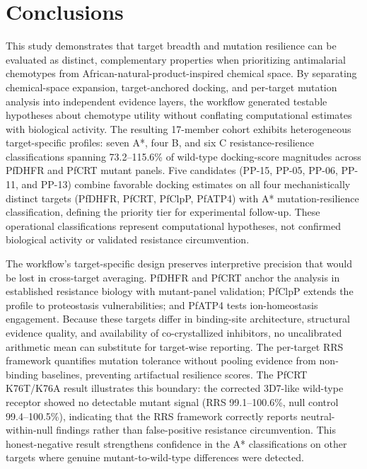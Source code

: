 \documentclass[11pt,a4paper]{article}
\begin{document}
	\section{Conclusions}\label{sec:conclusion}
This study demonstrates that target breadth and mutation resilience can be evaluated as distinct, complementary properties when prioritizing antimalarial chemotypes from African-natural-product-inspired chemical space. By separating chemical-space expansion, target-anchored docking, and per-target mutation analysis into independent evidence layers, the workflow generated testable hypotheses about chemotype utility without conflating computational estimates with biological activity. The resulting 17-member cohort exhibits heterogeneous target-specific profiles: seven A*, four B, and six C resistance-resilience classifications spanning 73.2--115.6\% of wild-type docking-score magnitudes across PfDHFR and PfCRT mutant panels. Five candidates (PP-15, PP-05, PP-06, PP-11, and PP-13) combine favorable docking estimates on all four mechanistically distinct targets (PfDHFR, PfCRT, PfClpP, PfATP4) with A* mutation-resilience classification, defining the priority tier for experimental follow-up. These operational classifications represent computational hypotheses, not confirmed biological activity or validated resistance circumvention.

The workflow's target-specific design preserves interpretive precision that would be lost in cross-target averaging. PfDHFR and PfCRT anchor the analysis in established resistance biology with mutant-panel validation; PfClpP extends the profile to proteostasis vulnerabilities; and PfATP4 tests ion-homeostasis engagement. Because these targets differ in binding-site architecture, structural evidence quality, and availability of co-crystallized inhibitors, no uncalibrated arithmetic mean can substitute for target-wise reporting. The per-target RRS framework quantifies mutation tolerance without pooling evidence from non-binding baselines, preventing artifactual resilience scores. The PfCRT K76T/K76A result illustrates this boundary: the corrected 3D7-like wild-type receptor showed no detectable mutant signal (RRS 99.1--100.6\%, null control 99.4--100.5\%), indicating that the RRS framework correctly reports neutral-within-null findings rather than false-positive resistance circumvention. This honest-negative result strengthens confidence in the A* classifications on other targets where genuine mutant-to-wild-type differences were detected.
\end{document}
